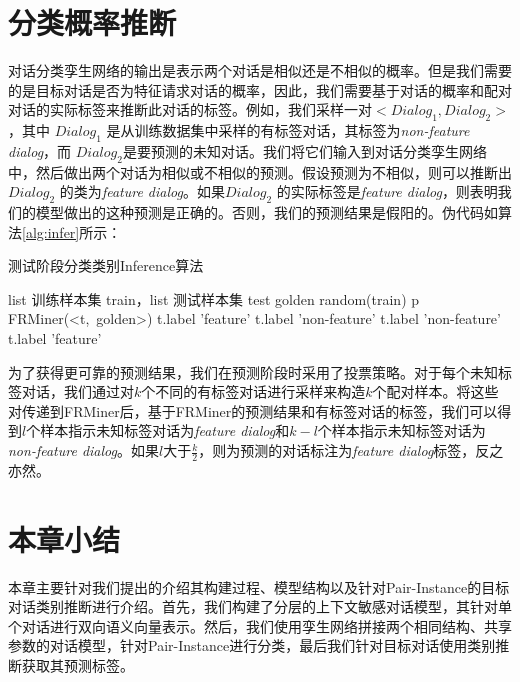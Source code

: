 \section{分类概率推断}
对话分类孪生网络的输出是表示两个对话是相似还是不相似的概率。但是我们需要的是目标对话是否为特征请求对话的概率，因此，我们需要基于对话的概率和配对对话的实际标签来推断此对话的标签。例如，我们采样一对$<Dialog_1,Dialog_2>$ ，其中 $Dialog_1$ 是从训练数据集中采样的有标签对话，其标签为\textit{non-feature dialog}，而 $Dialog_2$是要预测的未知对话。我们将它们输入到对话分类孪生网络中，然后做出两个对话为相似或不相似的预测。假设预测为不相似，则可以推断出$Dialog_2$ 的类为\textit{feature dialog}。如果$Dialog_2$ 的实际标签是\textit{feature dialog}，则表明我们的模型做出的这种预测是正确的。否则，我们的预测结果是假阳的。伪代码如算法\ref{alg:infer}所示：
    \begin{algorithm}[!htb]
            \caption{测试阶段分类类别Inference算法}  
            \label{alg:infer}
            \begin{algorithmic}[1]
                \Require list 训练样本集 train，list 测试样本集 test
                    \State golden \gets random(train)
                    \State p \gets FRMiner(<t,\ golden>)
                        \State t.label \gets 'feature'
                        \EndIf
                        \State t.label \gets 'non-feature'
                        \EndIf
                    \EndIf
                        \State t.label \gets 'non-feature'
                        \EndIf
                        \State t.label \gets 'feature'
                        \EndIf
                    \EndIf
                    \EndFor
                \EndFunction  
            \end{algorithmic}  
    \end{algorithm}
    
为了获得更可靠的预测结果，我们在预测阶段时采用了投票策略。对于每个未知标签对话，我们通过对$k$个不同的有标签对话进行采样来构造$k$个配对样本。将这些对传递到FRMiner后，基于FRMiner的预测结果和有标签对话的标签，我们可以得到$l$个样本指示未知标签对话为\textit{feature dialog}和$k-l$个样本指示未知标签对话为\textit{non-feature dialog}。如果$l$大于$\frac{k}{2}$，则为预测的对话标注为\textit{feature dialog}标签，反之亦然。



\section{本章小结}

本章主要针对我们提出的{\tool}介绍其构建过程、模型结构以及针对Pair-Instance的目标对话类别推断进行介绍。首先，我们构建了分层的上下文敏感对话模型，其针对单个对话进行双向语义向量表示。然后，我们使用孪生网络拼接两个相同结构、共享参数的对话模型，针对Pair-Instance进行分类，最后我们针对目标对话使用类别推断获取其预测标签。